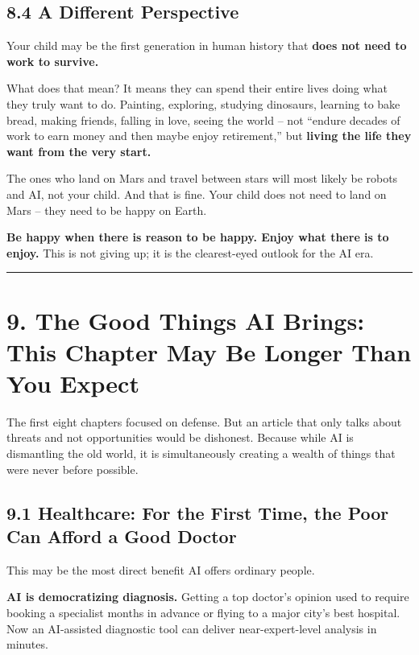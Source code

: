 \subsection{8.4 A Different Perspective}\label{a-different-perspective}

Your child may be the first generation in human history that
\textbf{does not need to work to survive.}

What does that mean? It means they can spend their entire lives doing
what they truly want to do. Painting, exploring, studying dinosaurs,
learning to bake bread, making friends, falling in love, seeing the
world -- not ``endure decades of work to earn money and then maybe enjoy
retirement,'' but \textbf{living the life they want from the very
start.}

The ones who land on Mars and travel between stars will most likely be
robots and AI, not your child. And that is fine. Your child does not
need to land on Mars -- they need to be happy on Earth.

\textbf{Be happy when there is reason to be happy. Enjoy what there is
to enjoy.} This is not giving up; it is the clearest-eyed outlook for
the AI era.

\begin{center}\rule{0.5\linewidth}{0.5pt}\end{center}

\section{9. The Good Things AI Brings: This Chapter May Be Longer Than
You
Expect}\label{the-good-things-ai-brings-this-chapter-may-be-longer-than-you-expect}

The first eight chapters focused on defense. But an article that only
talks about threats and not opportunities would be dishonest. Because
while AI is dismantling the old world, it is simultaneously creating a
wealth of things that were never before possible.

\subsection{9.1 Healthcare: For the First Time, the Poor Can Afford a
Good
Doctor}\label{healthcare-for-the-first-time-the-poor-can-afford-a-good-doctor}

This may be the most direct benefit AI offers ordinary people.

\textbf{AI is democratizing diagnosis.} Getting a top doctor's opinion
used to require booking a specialist months in advance or flying to a
major city's best hospital. Now an AI-assisted diagnostic tool can
deliver near-expert-level analysis in minutes.

